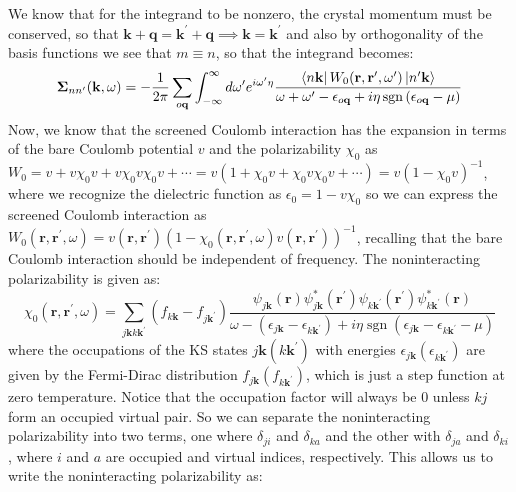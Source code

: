 \documentclass[12pt]{article}
\begin{document}
We know that for the integrand to be nonzero, the crystal momentum must be conserved, so that \(\mathbf{k} + \mathbf{q} = \mathbf{k}^{\prime} + \mathbf{q} \implies \mathbf{k} = \mathbf{k}^{\prime}\) and also by orthogonality of the basis functions we see that \(m\equiv n\), so that the integrand becomes:
\begin{equation}
    \boldsymbol{\Sigma}_{n n^{\prime}}(\mathbf{k}, \omega) = -\frac{1}{2 \pi} \sum_{o\mathbf{q}} \int_{-\infty}^{\infty} d \omega^{\prime} e^{i\omega ^{\prime}\eta } \frac{\bra{n\mathbf{k}}W_0(\mathbf{r}, \mathbf{r}^{\prime}, \omega^{\prime}) \ket{n^{\prime}\mathbf{k}}}{\omega + \omega^{\prime} - \epsilon_{o \mathbf{q}} + i \eta \operatorname{sgn}\left(\epsilon_{o \mathbf{q}}-\mu\right)}
\end{equation}
Now, we know that the screened Coulomb interaction has the expansion in terms of the bare Coulomb potential \(v\) and the polarizability \(\chi_0\) as \(W_0 = v + v\chi_0 v + v\chi_0 v\chi_0 v + \cdots = v(1 + \chi_0 v + \chi_0 v \chi_0 v + \cdots) = v\left(1 - \chi_0v\right)^{-1}\), where we recognize the dielectric function as \(\epsilon_0 = 1 - v\chi_0\) so we can express the screened Coulomb interaction as \(W_0(\mathbf{r}, \mathbf{r}^{\prime}, \omega) = v(\mathbf{r}, \mathbf{r}^{\prime})\left(1 - \chi_0(\mathbf{r}, \mathbf{r}^{\prime}, \omega)v(\mathbf{r}, \mathbf{r}^{\prime})\right)^{-1}\), recalling that the bare Coulomb interaction should be independent of frequency. The noninteracting polarizability is given as:
\begin{equation}
\chi_{0}\left(\mathbf{r}, \mathbf{r}^{\prime}, \omega\right)=\sum_{j\mathbf{k} k \mathbf{k}^{\prime}}\left(f_{k \mathbf{k}}-f_{j \mathbf{k}^{\prime}}\right) \frac{\psi_{j \mathbf{k}}(\mathbf{r}) \psi_{j \mathbf{k}}^{*}\left(\mathbf{r}^{\prime}\right) \psi_{k \mathbf{k}^{\prime}}\left(\mathbf{r}^{\prime}\right) \psi_{k \mathbf{k}^{\prime}}^{*}(\mathbf{r})}{\omega-\left(\epsilon_{j \mathbf{k}}-\epsilon_{k \mathbf{k}^{\prime}}\right)+i \eta \operatorname{sgn}\left(\epsilon_{j \mathbf{k}}-\epsilon_{k \mathbf{k}^{\prime} } - \mu\right)}
\end{equation}
where the occupations of the KS states \(j\mathbf{k}(k\mathbf{k}^{\prime})\) with energies \(\epsilon_{j\mathbf{k}}(\epsilon_{k\mathbf{k}^{\prime}})\) are given by the Fermi-Dirac distribution \(f_{j\mathbf{k}}(f_{k\mathbf{k}^{\prime}})\), which is just a step function at zero temperature. Notice that the occupation factor will always be 0 unless \(kj\) form an occupied virtual pair. So we can separate the noninteracting polarizability into two terms, one where \(\delta_{ji}\) and \(\delta_{ka}\) and the other with \(\delta_{ja}\) and \(\delta_{ki}\), where \(i\) and \(a\) are occupied and virtual indices, respectively. This allows us to write the noninteracting polarizability as:
\end{document}
